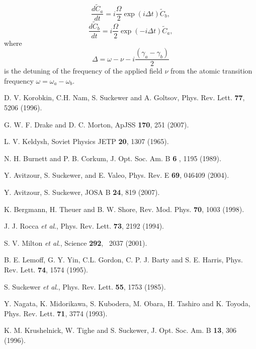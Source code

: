 \documentclass[preprint,preprintnumbers]{revtex4}
\begin{document}
\begin{equation}
\frac{d\tilde{C}_{a}}{dt}=i\frac{\Omega }{2}\exp \left( i\Delta t\right)
\tilde{C}_{b},  \label{a12}
\end{equation}%
\begin{equation}
\frac{d\tilde{C}_{b}}{dt}=i\frac{\Omega }{2}\exp \left( -i\Delta t\right)
\tilde{C}_{a},  \label{a13}
\end{equation}%
where%
\begin{equation*}
\Delta =\omega -\nu -i\frac{(\gamma _{a}-\gamma _{b})}{2}
\end{equation*}%
is the detuning of the frequency of the applied field $\nu $ from the atomic
transition frequency $\omega =\omega _{a}-\omega _{b}$.

\begin{thebibliography}{99}
 D. V. Korobkin, C.H. Nam, S. Suckewer and A. Goltsov, Phys.
Rev. Lett. \textbf{77}, 5206 (1996).

 G. W. F. Drake and D. C. Morton, ApJSS \textbf{170}, 251
(2007).

 L. V. Keldysh, Soviet Physics JETP \textbf{20}, 1307 (1965).

 N. H. Burnett and P. B. Corkum, J. Opt. Soc. Am. B \textbf{6%
}, 1195 (1989).

 Y. Avitzour, S. Suckewer, and E. Valeo, Phys. Rev. E \textbf{%
69}, 046409 (2004).

 Y. Avitzour, S. Suckewer, JOSA B \textbf{24}, 819 (2007).

 K. Bergmann, H. Theuer and B. W. Shore, Rev. Mod. Phys.
\textbf{70}, 1003 (1998).

 J. J. Rocca \textit{et al}., Phys. Rev. Lett. \textbf{73},
2192 (1994).

 S. V. Milton \textit{et al}., Science \textbf{292}, \ 2037
(2001).

 B. E. Lemoff, G. Y. Yin, C.L. Gordon, C. P. J. Barty and S.
E. Harris, Phys. Rev. Lett. \textbf{74}, 1574 (1995).

 S. Suckewer \textit{et al}., Phys. Rev. Lett. \textbf{55},
1753 (1985).

 Y. Nagata, K. Midorikawa, S. Kubodera, M. Obara, H. Tashiro
and K. Toyoda, Phys. Rev. Lett. \textbf{71}, 3774 (1993).

 K. M. Krushelnick, W. Tighe and S. Suckewer, J. Opt. Soc.
Am. B \textbf{13}, 306 (1996).
\end{thebibliography}
\end{document}
